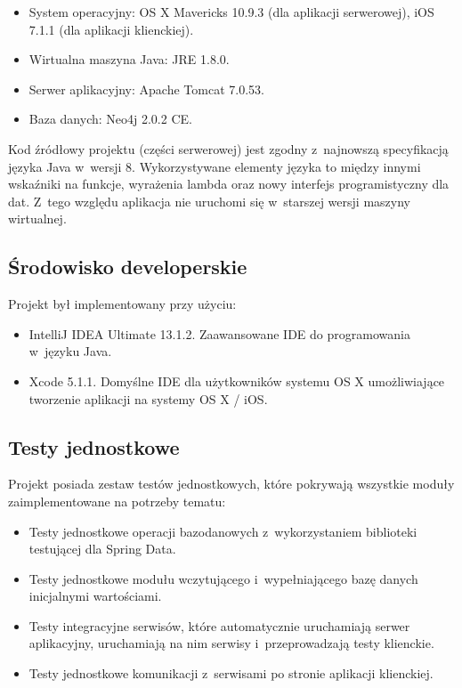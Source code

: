 \documentclass[a4paper,12pt]{article}
\begin{document}
	\begin{itemize}
		\item System operacyjny: OS X Mavericks 10.9.3 (dla aplikacji serwerowej), iOS 7.1.1 (dla aplikacji klienckiej).
		\item Wirtualna maszyna Java: JRE 1.8.0.
		\item Serwer aplikacyjny: Apache Tomcat 7.0.53.
		\item Baza danych: Neo4j 2.0.2 CE.
	\end{itemize}

	Kod źródłowy projektu (części serwerowej) jest zgodny z~najnowszą specyfikacją języka Java w~wersji 8. Wykorzystywane elementy języka to między innymi wskaźniki na funkcje, wyrażenia lambda oraz nowy interfejs programistyczny dla dat. Z~tego względu aplikacja nie uruchomi się w~starszej wersji maszyny wirtualnej.

	\subsection*{Środowisko developerskie}

	Projekt był implementowany przy użyciu:

	\begin{itemize}
		\item IntelliJ IDEA Ultimate 13.1.2. Zaawansowane IDE do programowania w~języku Java.
		\item Xcode 5.1.1. Domyślne IDE dla użytkowników systemu OS X umożliwiające tworzenie aplikacji na systemy OS X / iOS.
	\end{itemize}

	\subsection*{Testy jednostkowe}

	Projekt posiada zestaw testów jednostkowych, które pokrywają wszystkie moduły zaimplementowane na potrzeby tematu:

	\begin{itemize}
		\item Testy jednostkowe operacji bazodanowych z~wykorzystaniem biblioteki testującej dla Spring Data.
		\item Testy jednostkowe modułu wczytującego i~wypełniającego bazę danych inicjalnymi wartościami.
		\item Testy integracyjne serwisów, które automatycznie uruchamiają serwer aplikacyjny, uruchamiają na nim serwisy i~przeprowadzają testy klienckie.
		\item Testy jednostkowe komunikacji z~serwisami po stronie aplikacji klienckiej.
	\end{itemize}
\end{document}

